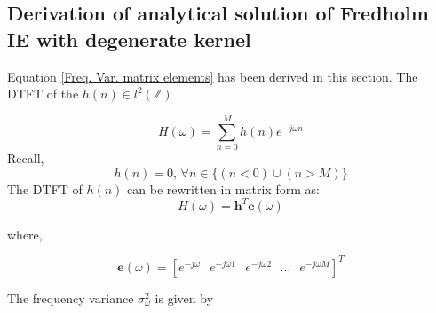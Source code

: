 \begin{appendix}
\appendixpage
\chapter{}
\pagestyle{empty}
\section{\label{apen:derivationdegenerate}Derivation of analytical solution of Fredholm IE with degenerate kernel}
\label{appendix-1}

Equation \ref{Freq. Var. matrix elements} has been derived in this section. The DTFT of the $h(n) \in l^2(\mathbb{Z})$  

\begin{equation}
H(\omega)=\sum^{M}_{n=0}h(n) e^{-j\omega n}
\end{equation}
Recall,
\begin{equation*}
h(n)=0 ,\, \forall n \in \{ (n < 0) \cup (n > M)\}
\end{equation*}
The DTFT of $h(n)$ can be rewritten in matrix form as:
\begin{equation}
H(\omega)=\mathbf{h}^{T}\mathbf{e}(\omega)
\end{equation}

where,

\begin{equation}
\mathbf{e}(\omega)=[e^{-j\omega}\,\,\,\ e^{-j\omega 1}\,\,\,\ e^{-j\omega 2}\,\,\,\,\ldots\,\,\,\ e^{-j\omega M}]^T
\end{equation}

The frequency variance $\sigma_{\omega}^{2}$ is given by


\end{appendix}
